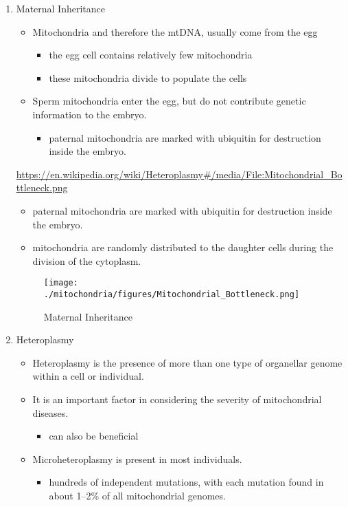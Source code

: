 \documentclass{scrartcl}
\begin{document}
\begin{enumerate}
\item Maternal Inheritance
\label{sec:orgc64950f}
\begin{itemize}
\item Mitochondria and therefore the mtDNA, usually come from the egg
\begin{itemize}
\item the egg cell contains relatively few mitochondria
\item these mitochondria divide to populate the cells
\end{itemize}
\item Sperm mitochondria enter the egg, but do not contribute genetic
information to the embryo.
\begin{itemize}
\item paternal mitochondria are marked with ubiquitin for destruction
inside the embryo.
\end{itemize}
\end{itemize}
\url{https://en.wikipedia.org/wiki/Heteroplasmy\#/media/File:Mitochondrial\_Bottleneck.png}

\begin{itemize}
\item paternal mitochondria are marked with ubiquitin for destruction
inside the embryo.
\item mitochondria are randomly distributed to the daughter cells during
the division of the cytoplasm.
\end{itemize}

\begin{figure}[htbp]
\centering
\texttt{[image: ./mitochondria/figures/Mitochondrial\_Bottleneck.png]}
\caption[mom]{\label{fig:org62e5066}
Maternal Inheritance}
\end{figure}

\item Heteroplasmy
\label{sec:org64d22b1}

\begin{itemize}
\item Heteroplasmy is the presence of more than one type of organellar
genome within a cell or individual.

\item It is an important factor in considering the severity of
mitochondrial diseases.
\begin{itemize}
\item can also be beneficial
\end{itemize}

\item Microheteroplasmy is present in most individuals.
\begin{itemize}
\item hundreds of independent mutations, with each mutation found in
about 1–2\% of all mitochondrial genomes.
\end{itemize}
\end{itemize}



\end{enumerate}
\end{document}
